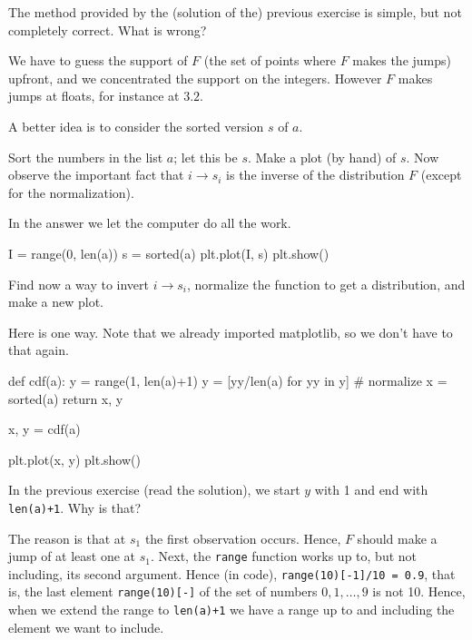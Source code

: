 \documentclass{scrartcl}
\begin{document}
\begin{exercise}\label{ex:2}
  The method provided by the (solution of the) previous exercise is simple, but not completely correct. What is wrong?
  \begin{solution}
    We have to guess the support of $F$ (the set of points where $F$ makes the jumps) upfront, and we concentrated the support on the integers. However $F$ makes jumps at floats, for instance  at $3.2$. 
  \end{solution}
\end{exercise}

A better idea is to consider the sorted version $s$ of $a$. 

\begin{exercise}
  Sort the numbers in the list $a$; let this be $s$.  Make a plot (by hand) of $s$.  Now observe the important fact that $i\to s_i$ is the inverse of the distribution $F$ (except for the normalization).
  \begin{solution}
    In the answer we let the computer do all the work.  

\begin{pyblock}
I = range(0, len(a))
s = sorted(a)
plt.plot(I, s)
plt.show()
\end{pyblock}
  \end{solution}
\end{exercise}

\begin{exercise}
  Find now a way to invert $i\to s_i$, normalize the function to get a distribution, and make a new plot. 
  \begin{solution}
Here is one way. Note that we already imported matplotlib, so we don't have to that again.
\begin{pyblock}
def cdf(a):  
    y = range(1, len(a)+1)
    y = [yy/len(a) for yy in y] # normalize
    x = sorted(a)
    return x, y

x, y = cdf(a)

plt.plot(x, y)
plt.show()
\end{pyblock}


  \end{solution}
\end{exercise}

\begin{exercise}
In the previous exercise (read the solution), we start $y$ with 1 and end with \texttt{len(a)+1}. Why is that? 
  \begin{solution}
    The reason is that at $s_1$ the first observation occurs. Hence, $F$ should make a jump of at least one at $s_1$. Next, the \texttt{range} function works up to, but not including, its second argument. Hence (in code), \texttt{range(10)[-1]/10 = 0.9}, that is, the last element \texttt{range(10)[-]} of the set of numbers $0, 1, \ldots, 9$ is not 10. Hence, when we extend the range to \texttt{len(a)+1} we have a range up to and including the element we want to include.
  \end{solution}
\end{exercise}
\end{document}
